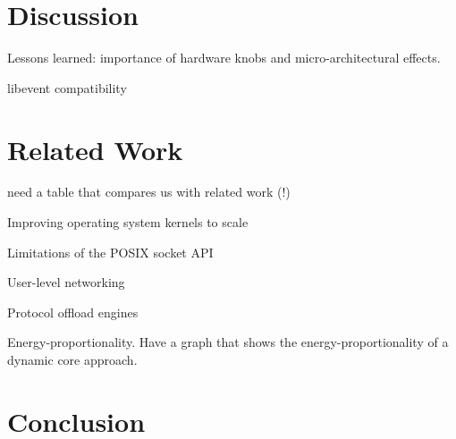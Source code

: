 



\section{Discussion}

\todo Lessons learned: importance of hardware knobs and micro-architectural effects.

\todo libevent compatibility


\section{Related Work}

\todo need a table that compares us with related work (!)

\todo Improving operating system kernels to scale

\todo Limitations of the POSIX socket API

\todo User-level networking

\todo Protocol offload engines

\todo Energy-proportionality.   Have a graph that shows the energy-proportionality of a dynamic core approach.

\section{Conclusion}




